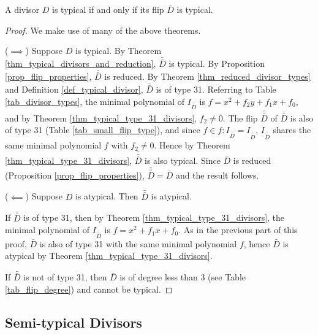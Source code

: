 \begin{theorem}
  A divisor $D$ is typical if and only if its flip $\bar D$ is typical.
\end{theorem}
\begin{proof}
  We make use of many of the above theorems.
  
  ($\implies$)
  Suppose $D$ is typical.
  By Theorem \ref{thm_typical_divisors_and_reduction}, $\bar{\bar D}$ is typical.
  By Proposition \ref{prop_flip_properties}, $\bar{\bar D}$ is reduced.
  By Theorem \ref{thm_reduced_divisor_types} and Definition \ref{def_typical_divisor},
  $\bar{\bar D}$ is of type 31.
  Referring to Table \ref{tab_divisor_types},
  the minimal polynomial of $I_{\bar{\bar D}}$ is $f = x^2 + f_2y + f_1x + f_0$,
  and by Theorem \ref{thm_typical_type_31_divisors}, $f_2 \neq 0$.
  The flip $\bar{\bar{\bar D}}$ of $\bar{\bar D}$ is also of type 31 (Table \ref{tab_small_flip_type}),
  and since $f \in f : I_{\bar{\bar D}} = I_{\bar{\bar{\bar D}}}$,
  $I_{\bar{\bar{\bar D}}}$ shares the same minimal polynomial $f$ with $f_2 \neq 0$.
  Hence by Theorem \ref{thm_typical_type_31_divisors}, $\bar{\bar{\bar D}}$ is also typical.
  Since $\bar D$ is reduced (Proposition \ref{prop_flip_properties}),
  $\bar{\bar{\bar D}} = \bar D$ and the result follows.

  ($\impliedby$)
  Suppose $D$ is atypical.
  Then $\bar{\bar D}$ is atypical.
  
  If $\bar{\bar D}$ is of type 31, then by Theorem \ref{thm_typical_type_31_divisors},
  the minimal polynomial of $I_{\bar{\bar D}}$ is $f = x^2 + f_1x + f_0$.
  As in the previous part of this proof, $\bar D$ is also of type 31 with the same minimal polynomial $f$,
  hence $\bar D$ is atypical by Theorem \ref{thm_typical_type_31_divisors}.
  
  If $\bar{\bar D}$ is not of type 31, then $\bar D$ is of degree less than 3 (see Table \ref{tab_flip_degree})
  and cannot be typical.
\end{proof}




\subsection{Semi-typical Divisors}
\label{sec_semitypical_divisors}

